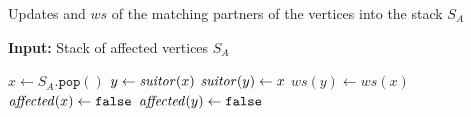 \begin{algorithm}[t]
\footnotesize
\caption{\footnotesize Updates \vsuitor and $ws$ of the matching partners of the
vertices into the stack $S_A$}
\label{algo:dyn-suitor-update-aff}
\textbf{Input:} Stack of affected vertices $S_A$

\begin{algorithmic}[1]
\State$x \gets S_A.\texttt{pop}()$
\State$y \gets \mathit{suitor}(x)$
\State$\mathit{suitor}(y) \gets x$\label{line:dyn-mwm:update-aff-1}
\State$ws(y) \gets ws(x)$\label{line:dyn-mwm:update-aff-2}
\State$\mathit{affected}(x) \gets \texttt{false}$\label{line:dyn-mwm:update-aff-unaff-1}
\State$\mathit{affected}(y) \gets \texttt{false}$\label{line:dyn-mwm:update-aff-unaff-2}
\EndWhile
\end{algorithmic}
\end{algorithm}
